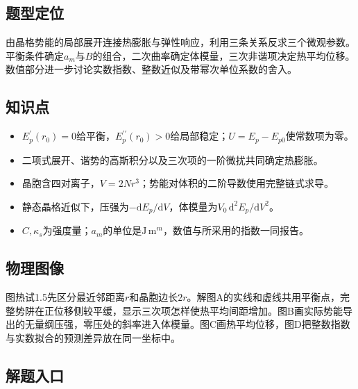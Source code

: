 \documentclass[UTF8,fontset=fandol,a4paper,11pt]{ctexart}
\begin{document}


\subsection*{题型定位}

由晶格势能的局部展开连接热膨胀与弹性响应，利用三条关系反求三个微观参数。平衡条件确定$a_m$与$B$的组合，二次曲率确定体模量，三次非谐项决定热平均位移。数值部分进一步讨论实数指数、整数近似及带幂次单位系数的舍入。



\subsection*{知识点}

\begin{itemize}
\item $E_p^\prime(r_0)=0$给平衡，$E_p^{\prime\prime}(r_0)>0$给局部稳定；$U=E_p-E_{p0}$使常数项为零。
\item 二项式展开、谐势的高斯积分以及三次项的一阶微扰共同确定热膨胀。
\item 晶胞含四对离子，$V=2Nr^3$；势能对体积的二阶导数使用完整链式求导。
\item 静态晶格近似下，压强为$-\mathrm dE_p/\mathrm dV$，体模量为$V_0\,\mathrm d^2E_p/\mathrm dV^2$。
\item $C,\kappa_s$为强度量；$a_m$的单位是$\mathrm J\,\mathrm m^m$，数值与所采用的指数一同报告。
\end{itemize}



\subsection*{物理图像}

图热试1.5先区分最近邻距离$r$和晶胞边长$2r$。解图A的实线和虚线共用平衡点，完整势阱在正位移侧较平缓，显示三次项怎样使热平均间距增加。图B画实际势能导出的无量纲压强，零压处的斜率进入体模量。图C画热平均位移，图D把整数指数与实数拟合的预测差异放在同一坐标中。



\subsection*{解题入口}
\end{document}
